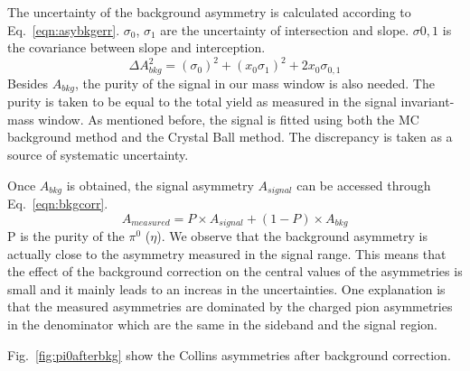 The uncertainty of the background asymmetry is calculated according to Eq.~\eqref{eqn:asybkgerr}. $\sigma_0$, $\sigma_1$ are the uncertainty of intersection and slope. $\sigma{0,1}$ is the covariance between slope and interception.
\begin{equation}
\Delta A^2_{bkg}= (\sigma_0)^2 + (x_0\sigma_1)^2 + 2x_0\sigma_{0,1}
\label{eqn:asybkgerr}
\end{equation}
Besides $A_{bkg}$, the purity of the signal in our mass window is also needed. The purity is taken to be equal to the total yield as measured in the signal invariant-mass window. As mentioned before, the signal is fitted using both the MC background method and the Crystal Ball method. The discrepancy is taken as a source of systematic uncertainty.


Once $A_{bkg}$ is obtained, the signal asymmetry $A_{signal}$ can be accessed through Eq.~\eqref{eqn:bkgcorr}. 
\begin{equation}
A_{measured}=P\times A_{signal}+(1-P )\times A_{bkg}
\label{eqn:bkgcorr}
\end{equation}
P is the purity of the $\pi^0$ ($\eta$). We observe that the background asymmetry is actually close to the asymmetry measured in the  signal range. This means that the effect of the background correction on the central values of the asymmetries is small and it mainly leads to an increas in the uncertainties. One explanation is that the measured asymmetries are dominated by the charged pion asymmetries in the denominator which are the same in the sideband and the signal region.

Fig.~\ref{fig:pi0afterbkg} show the Collins asymmetries after background correction.

